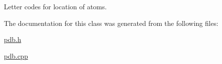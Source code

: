 Letter codes for location of atoms. 



The documentation for this class was generated from the following files\-:\begin{DoxyCompactItemize}
\item 
\hyperlink{pdb_8h}{pdb.\-h}\item 
\hyperlink{pdb_8cpp}{pdb.\-cpp}\end{DoxyCompactItemize}
